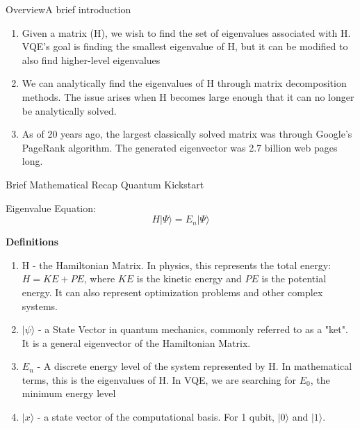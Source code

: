 \def\OtherAuthors{ and (primarily) Jonah Sachs}


\begin{frame}{Overview}{A brief introduction}
\begin{enumerate}
    \item Given a matrix (H), we wish to find the set of eigenvalues associated with H. VQE's goal is  finding the smallest eigenvalue of H, but it can be modified to also find higher-level eigenvalues
    \vspace{5mm}
    \item We can analytically find the eigenvalues of H through matrix decomposition methods. The issue arises when H becomes large enough that it can no longer be analytically solved.
    \vspace{5mm}
    \item As of 20 years ago, the largest classically solved matrix was through Google's PageRank algorithm. The generated eigenvector was 2.7 billion web pages long.
    
\end{enumerate}
\end{frame}

\begin{frame}{Brief Mathematical Recap} {Quantum Kickstart}

Eigenvalue Equation: $$H | \Psi \rangle = E_n |\Psi \rangle$$

\textbf{Definitions}
\begin{enumerate}
    \item H - the Hamiltonian Matrix. In physics, this represents the total energy: \( H = KE + PE \), where \( KE \) is the kinetic energy and \( PE \) is the potential energy. It can also represent optimization problems and other complex systems. 
    \vspace{2mm}
    \item \textbf{$| \psi \rangle$} - a State Vector in quantum mechanics, commonly referred to as a "ket". It is a general eigenvector of the Hamiltonian Matrix. 
    \vspace{2mm}
    \item $E_n$ - A discrete energy level of the system represented by H. In mathematical terms, this is the eigenvalues of H. In VQE, we are searching for $E_0$, the minimum energy level
    \vspace{2mm}
    \item $| x \rangle$ - a state vector of the computational basis. For 1 qubit, $| 0 \rangle$ and $| 1 \rangle$.
\end{enumerate}

\end{frame}

